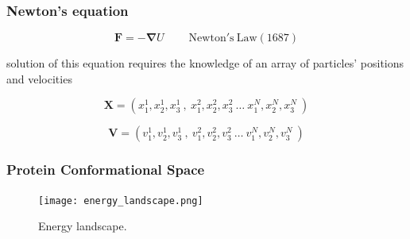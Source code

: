 \documentclass{beamer}
\begin{document}

\begin{frame}
  \frametitle{Newton's equation}
  
  \begin{equation}
	  \mathbf{F}= - \mathbf{\nabla} U      \mathrm{~~~~~~~~~~Newton's~ Law (1687)}
  \end{equation}

  solution of this equation requires the knowledge of an array of
  particles' positions and velocities

  \begin{equation}
          \mathbf{X}= (x^1_1,x^1_2,x^1_3 ~,~ x^2_1,x^2_2,x^2_3 ~\ldots~ x^N_1,x^N_2,x^N_3~)
  \end{equation}


  \begin{equation}
          \mathbf{V}= (v^1_1,v^1_2,v^1_3~,~ v^2_1,v^2_2,v^2_3 ~\ldots~ v^N_1,v^N_2,v^N_3~)
  \end{equation}

\end{frame}


\begin{frame}\frametitle{Protein Conformational Space}

\begin{figure}
\texttt{[image: energy\_landscape.png]}
\caption{{\scriptsize Energy landscape. }}
\end{figure}

\end{frame}
\end{document}
